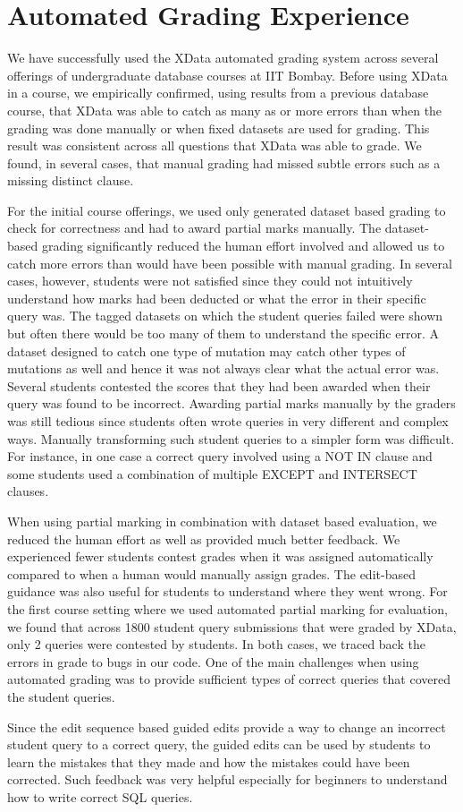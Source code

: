 \section{Automated Grading Experience}
\label{sec:exp}
We have successfully used the XData automated grading system across several offerings of undergraduate database courses at IIT Bombay. Before using XData in a course, we empirically confirmed, using results from a previous database course, that XData was able to catch as many as or more errors than when the grading was done manually or when fixed datasets are used for grading. This result was consistent across all questions that XData was able to grade. We found, in several cases, that manual grading had missed subtle errors such as a missing distinct clause. 

For the initial course offerings, we used only generated dataset based grading to check for correctness and had to award partial marks manually. The dataset-based grading significantly reduced the human effort involved and allowed us to catch more errors than would have been possible with manual grading.
In several cases, however, students were not satisfied since they could not intuitively understand how marks had been deducted or what the error in their specific query was. The tagged datasets on which the student queries failed were shown but often there would be too many of them to understand the specific error. A dataset designed to catch one type of mutation may catch other types of mutations as well and hence it was not always clear what the actual error was. Several students contested the scores that they had been awarded when their query was found to be incorrect. Awarding partial marks manually by the graders was still tedious since students often wrote queries in very different and complex ways. Manually transforming such student queries to a simpler form was difficult. For instance, in one case a correct query involved using a NOT IN clause and some students used a combination of multiple EXCEPT and INTERSECT clauses.  

When using partial marking in combination with dataset based evaluation, we reduced the human effort as well as provided much better feedback. 
We experienced fewer students contest grades when it was assigned automatically compared to when a human would manually assign grades. The edit-based guidance was also  useful for students to understand where they went wrong. For the first course setting where we used automated partial marking for evaluation, we found that across 1800 student query submissions that were graded by XData, only 2 queries were contested by students. In both cases, we traced back the errors in grade to bugs in our code. One of the main challenges when using automated grading was to provide sufficient types of correct queries that covered the student queries.  

Since the edit sequence based guided edits provide a way to change an incorrect student query to a correct query, the guided edits can be used by students to learn the mistakes that they made and how the mistakes could have been corrected. Such feedback was very helpful especially for beginners to understand how to write correct SQL queries.  